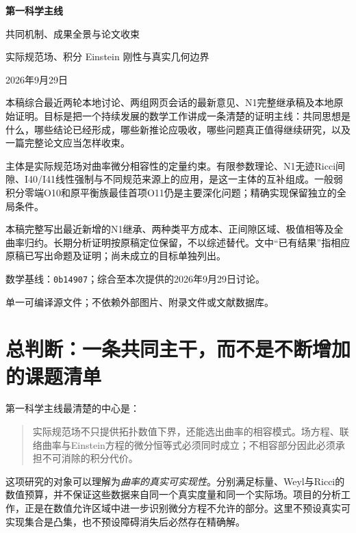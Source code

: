 \documentclass[UTF8,fontset=fandol,zihao=-4,a4paper]{ctexart}
\theoremstyle{remark}
\begin{document}
\begin{titlepage}
\centering
\vspace*{18mm}
{\LARGE\bfseries 第一科学主线\par}
\vspace{5mm}
{\Large 共同机制、成果全景与论文收束\par}
\vspace{7mm}
{\large 实际规范场、积分 Einstein 刚性与真实几何边界\par}
\vspace{10mm}
{2026年9月29日\par}
\vspace{12mm}
\begin{minipage}{0.9\textwidth}
本稿综合最近两轮本地讨论、两组网页会话的最新意见、N1完整继承稿及本地原始证明。目标是把一个持续发展的数学工作讲成一条清楚的证明主线：共同思想是什么，哪些结论已经形成，哪些新推论应吸收，哪些问题真正值得继续研究，以及一篇完整论文应当怎样收束。

主体是实际规范场对曲率微分相容性的定量约束。有限参数理论、N1无迹Ricci间隙、I40/I41线性强制与不同规范来源上的应用，是这一主体的互补组成。一般弱积分零端O10和原平衡族最佳首项O11仍是主要深化问题；精确实现保留独立的全局条件。

本稿完整写出最近新增的N1继承、两种类平方成本、正间隙区域、极值相等及全曲率归约。长期分析证明按原稿定位保留，不以综述替代。文中“已有结果”指相应原稿已写出命题及证明；尚未成立的目标单独列出。
\end{minipage}
\vfill
{\small 数学基线：\texttt{0b14907}；综合至本次提供的2026年9月29日讨论。\par}
{\small 单一可编译源文件；不依赖外部图片、附录文件或文献数据库。\par}
\end{titlepage}
\tableofcontents
\newpage

\section{总判断：一条共同主干，而不是不断增加的课题清单}

第一科学主线最清楚的中心是：
\begin{quote}
实际规范场不只提供拓扑数值下界，还能选出曲率的相容模式。场方程、联络曲率与Einstein方程的微分恒等式必须同时成立；不相容部分因此必须承担不可消除的积分代价。
\end{quote}

这项研究的对象可以理解为\emph{曲率的真实可实现性}。分别满足标量、Weyl与Ricci的数值预算，并不保证这些数据来自同一个真实度量和同一个实际场。项目的分析工作，正是在数值允许区域中进一步识别微分方程不允许的部分。这里不预设真实可实现集合是凸集，也不预设障碍消失后必然存在精确解。
\end{document}
